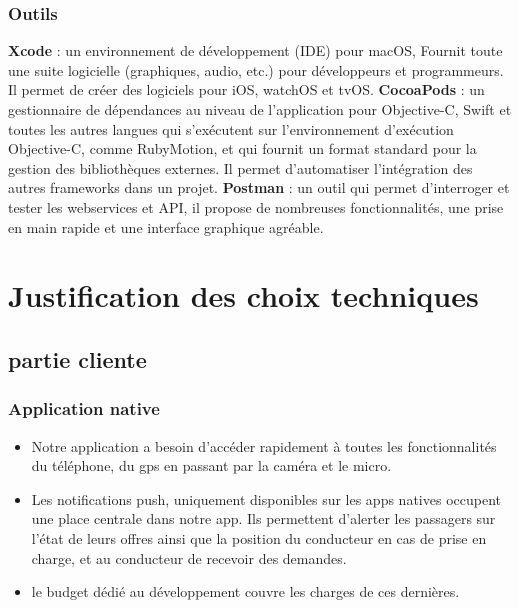 \subsubsection{Outils} %
\label{ssub:outils}
\begin{itemize}
	\itemb \textbf{Xcode} : un environnement de développement (IDE) pour macOS, Fournit toute une suite logicielle (graphiques, audio, etc.) pour développeurs et programmeurs. Il permet de créer des logiciels pour iOS, watchOS et tvOS.
	\itemb \textbf{CocoaPods} : un gestionnaire de dépendances au niveau de l'application pour Objective-C, Swift et toutes les autres langues qui s'exécutent sur l'environnement d'exécution Objective-C, comme RubyMotion, et qui fournit un format standard pour la gestion des bibliothèques externes. Il permet d'automatiser l’intégration des autres frameworks dans un projet.
	\itemb \textbf{Postman} : un outil qui permet d'interroger et tester les webservices et API, il propose de nombreuses fonctionnalités, une prise en main rapide et une interface graphique agréable.
\end{itemize}

\section{Justification des choix techniques} %
\label{sec:justification_du_choix_technique}
\subsection{partie cliente} %
\label{sub:partie_cliente}
\subsubsection{Application native} %
\label{ssub:application_native}
\begin{itemize}
	\item Notre application a besoin d’accéder rapidement à toutes les fonctionnalités du téléphone, du gps en passant par la caméra et le micro.
	\item Les notifications push, uniquement disponibles sur les apps natives occupent une place centrale dans notre app. Ils permettent d’alerter les passagers sur l'état de leurs offres ainsi que la position du conducteur en cas de prise en charge, et au conducteur de recevoir des demandes.
	\item le budget dédié au développement couvre les charges de ces dernières.
\end{itemize}

